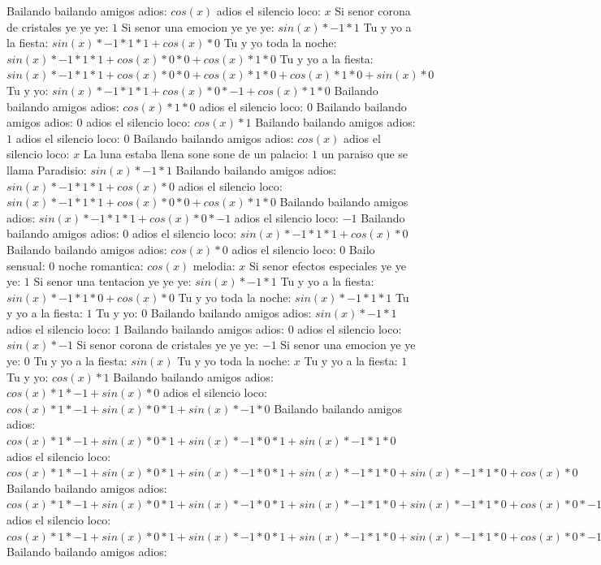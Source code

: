 \documentclass{article}
\begin{document}
Bailando bailando amigos adios: $cos(x)$  \newline adios el silencio loco: $x$ Si senor corona de cristales ye ye ye: $1$  \newline Si senor una emocion ye ye ye: $sin(x)*-1*1$ Tu y yo a la fiesta: $sin(x)*-1*1*1+cos(x)*0$ Tu y yo toda la noche: ${sin(x)*-1*1*1+cos(x)*0}*0+cos(x)*1*0$ Tu y yo a la fiesta: ${sin(x)*-1*1*1+cos(x)*0}*0+cos(x)*1*0+cos(x)*1*0+sin(x)*0$ Tu y yo: ${sin(x)*-1*1*1+cos(x)*0}*-1+cos(x)*1*0$  \newline Bailando bailando amigos adios: $cos(x)*1*0$ adios el silencio loco: $0$ Bailando bailando amigos adios: $0$  \newline adios el silencio loco: $cos(x)*1$ Bailando bailando amigos adios: $1$ adios el silencio loco: $0$  \newline Bailando bailando amigos adios: $cos(x)$  \newline adios el silencio loco: $x$ La luna estaba llena sone sone de un palacio: $1$  \newline un paraiso que se llama Paradisio: $sin(x)*-1*1$ Bailando bailando amigos adios: $sin(x)*-1*1*1+cos(x)*0$ adios el silencio loco: ${sin(x)*-1*1*1+cos(x)*0}*0+cos(x)*1*0$ Bailando bailando amigos adios: ${sin(x)*-1*1*1+cos(x)*0}*-1$ adios el silencio loco: $-1$ Bailando bailando amigos adios: $0$  \newline adios el silencio loco: $sin(x)*-1*1*1+cos(x)*0$  \newline Bailando bailando amigos adios: $cos(x)*0$ adios el silencio loco: $0$ Bailo sensual: $0$  \newline noche romantica: $cos(x)$  \newline melodia: $x$ Si senor efectos especiales ye ye ye: $1$  \newline Si senor una tentacion ye ye ye: $sin(x)*-1*1$ Tu y yo a la fiesta: $sin(x)*-1*1*0+cos(x)*0$ Tu y yo toda la noche: $sin(x)*-1*1*1$ Tu y yo a la fiesta: $1$ Tu y yo: $0$  \newline Bailando bailando amigos adios: $sin(x)*-1*1$ adios el silencio loco: $1$ Bailando bailando amigos adios: $0$  \newline adios el silencio loco: $sin(x)*-1$ Si senor corona de cristales ye ye ye: $-1$ Si senor una emocion ye ye ye: $0$  \newline Tu y yo a la fiesta: $sin(x)$  \newline Tu y yo toda la noche: $x$ Tu y yo a la fiesta: $1$  \newline Tu y yo: $cos(x)*1$ Bailando bailando amigos adios: $cos(x)*1*-1+sin(x)*0$ adios el silencio loco: ${cos(x)*1*-1+sin(x)*0}*1+sin(x)*-1*0$ Bailando bailando amigos adios: ${{cos(x)*1*-1+sin(x)*0}*1+sin(x)*-1*0}*1+sin(x)*-1*1*0$ adios el silencio loco: ${{cos(x)*1*-1+sin(x)*0}*1+sin(x)*-1*0}*1+sin(x)*-1*1*0+sin(x)*-1*1*0+cos(x)*0$ Bailando bailando amigos adios: ${{{cos(x)*1*-1+sin(x)*0}*1+sin(x)*-1*0}*1+sin(x)*-1*1*0+sin(x)*-1*1*0+cos(x)*0}*-1+{sin(x)*-1*1*1+cos(x)*0}*0$ adios el silencio loco: ${{{cos(x)*1*-1+sin(x)*0}*1+sin(x)*-1*0}*1+sin(x)*-1*1*0+sin(x)*-1*1*0+cos(x)*0}*-1+{sin(x)*-1*1*1+cos(x)*0}*0+{sin(x)*-1*1*1+cos(x)*0}*0+cos(x)*1*0$ Bailando bailando amigos adios: 
\end{document}
